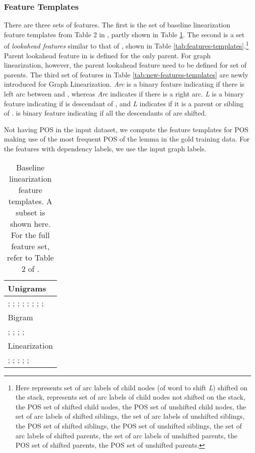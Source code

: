 \documentclass[11pt]{article}
\begin{document}
\subsubsection{Feature Templates}
There are three sets of features. The first is the set of baseline linearization feature templates from Table 2 in , partly shown in Table \ref{tab:features-templates-standard}. The second is a set of {\it lookahead features} similar to that of , shown in Table  \ref{tab:features-templates}.\footnote{Here  represents set of arc labels of child nodes (of word to shift {\it L}) shifted on the stack,  represents set of arc labels of child nodes not shifted on the stack,  the POS set of shifted child nodes,  the POS set of unshifted child nodes,  the set of arc labels of shifted siblings,  the set of arc labels of unshifted siblings,  the POS set of shifted siblings,  the POS set of unshifted siblings,  the set of arc labels of shifted parents,  the set of arc labels of unshifted parents,  the POS set of shifted parents,  the POS set of unshifted parents.} Parent lookahead feature in  is defined for the only parent. For graph linearization, however, the parent lookahead feature need to be defined for set of parents. The third set of features in Table \ref{tab:new-features-templates} are newly introduced for Graph Linearization. {\it Arc} is a binary feature indicating if there is left arc between  and , whereas {\it Arc} indicates if there is a right arc.  {\it L} is a binary feature indicating if  is descendant of , and {\it L} indicates if it is a parent or sibling of . {\it } is binary feature indicating if all the descendants of  are shifted. 

Not having POS in the input dataset, we compute the feature templates for POS making use of the most frequent POS of the lemma in the gold training data. For the features with dependency labels, we use the input graph labels. 

\begin{table}[t]
\centering
\footnotesize
\begin{tabularx}{.45\textwidth}{X}

  \hline
  Unigrams \\

  \hline
  ; ; ;  ;  ;   ;  ;  ;  \\


\hline \hline
  Bigram \\
  \hline
  ; ; ; ;\\ 
\hline \hline
Linearization \\
  \hline
  ; ; ; ; ; \\
\hline

\end{tabularx}
\caption{Baseline linearization feature templates. A subset is shown here. For the full feature set, refer to Table 2 of .}
\label{tab:features-templates-standard}
\end{table}
\end{document}
